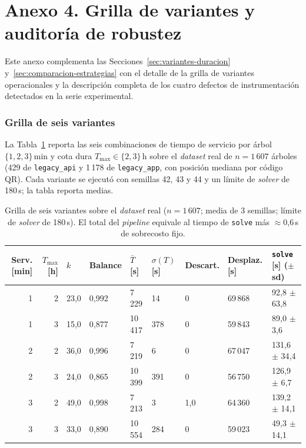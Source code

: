 \section*{Anexo 4. Grilla de variantes y auditoría de robustez}
\label{anx:grilla-variantes}

Este anexo complementa las Secciones~\ref{sec:variantes-duracion}
y~\ref{sec:comparacion-estrategias} con el detalle de la grilla de variantes operacionales
y la descripción completa de los cuatro defectos de instrumentación detectados
en la serie experimental.

\subsubsection*{Grilla de seis variantes}

La Tabla~\ref{tab:grilla-variantes} reporta las seis combinaciones de tiempo de servicio
por árbol $\{1, 2, 3\}$\,min y cota dura $T_{\max} \in \{2, 3\}$\,h sobre el
\textit{dataset} real de $n=1\,607$ árboles (429 de \texttt{legacy\_api} y 1\,178 de
\texttt{legacy\_app}, con posición mediana por código QR). Cada variante se ejecutó con
semillas 42, 43 y 44 y un límite de \textit{solver} de 180\,s; la tabla reporta medias.

\begin{table}[H]
  \centering
  \caption{Grilla de seis variantes sobre el \textit{dataset} real ($n=1\,607$; media de 3 semillas; límite de \textit{solver} de 180\,s). El total del \textit{pipeline} equivale al tiempo de \texttt{solve} más $\approx$0{,}6\,s de sobrecosto fijo.}
  \label{tab:grilla-variantes}
  \small
  \begin{tabularx}{\textwidth}{rrXXXXXXX}
    \toprule
    Serv. [min] & $T_{\max}$ [h] & $k$ & Balance & $\bar{T}$ [s] & $\sigma(T)$ [s] & Descart. & Desplaz. [s] & \texttt{solve} [s] ($\pm$\,sd) \\
    \midrule
    1 & 2 & 23{,}0 & 0{,}992 & 7\,229  & 14  & 0     & 69\,868 & 92{,}8 $\pm$ 63{,}8 \\
    1 & 3 & 15{,}0 & 0{,}877 & 10\,417 & 378 & 0     & 59\,843 & 89{,}0 $\pm$ 3{,}6 \\
    2 & 2 & 36{,}0 & 0{,}996 & 7\,219  & 6   & 0     & 67\,047 & 131{,}6 $\pm$ 34{,}4 \\
    2 & 3 & 24{,}0 & 0{,}865 & 10\,399 & 391 & 0     & 56\,750 & 126{,}9 $\pm$ 6{,}7 \\
    3 & 2 & 49{,}0 & 0{,}998 & 7\,213  & 3   & 1{,}0 & 64\,360 & 139{,}2 $\pm$ 14{,}1 \\
    3 & 3 & 33{,}0 & 0{,}890 & 10\,554 & 284 & 0     & 59\,023 & 49{,}3 $\pm$ 14{,}1 \\
    \bottomrule
  \end{tabularx}
\end{table}

